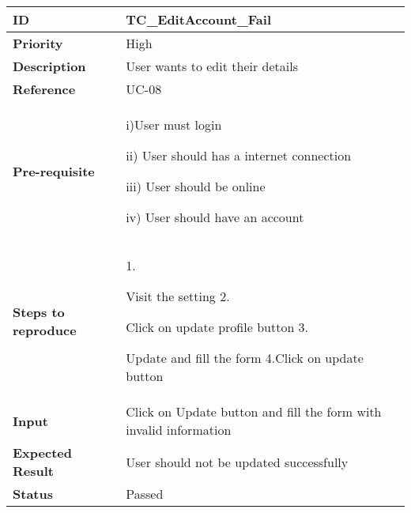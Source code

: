 \begin{center}
    \begin{tabularx}{\textwidth}{|l|X|}
        \hline
        \textbf{ID}                 & TC\_EditAccount\_Fail                                             \\
        \hline
        \textbf{Priority}           & High                                                              \\
        \hline
        \textbf{Description}        & User wants to edit their details                                  \\
        \hline
        \textbf{Reference}          & UC-08                                                             \\
        \hline
        \textbf{Pre-requisite}      & i)User must login

        ii) User should has a internet connection

        iii) User should be online

        iv) User should have an account                                                                 \\
        \hline
        \textbf{Steps to reproduce} & 1.

        Visit the setting 2.

        Click on update profile button 3.

        Update and fill the form 4.Click on update button                                               \\
        \hline
        \textbf{Input}              & Click on Update button and fill the form with invalid information \\
        \hline
        \textbf{Expected Result}    & User should not be updated successfully                           \\
        \hline
        \textbf{Status}             & Passed                                                            \\
        \hline
    \end{tabularx}
\end{center}
\newpage


